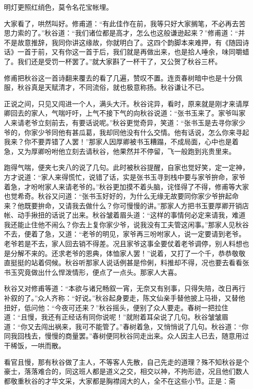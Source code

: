 \documentclass[12pt,UTF8]{ctexbook}
\begin{document}
{{{明灯更照红绡色，莫令名花宝帐埋。

大家看了，哄然叫好。修甫道：“有此佳作在前，我等只好大家搁笔，不必再去苦思力索的了。”秋谷道：“我们诸位都是高才，怎么也这般谦逊起来？”修甫道：“并不是故意推辞，我同你讲这缘故，你就明白了。这四个韵脚本来难押，有《随园诗话》一首于前，又有你这一首于后，我们就是再做出来，也是拾人唾余，味同嚼蜡了。我们还是受罚一杯罢了。”就大家斟了一杯干了，又公贺了秋谷三杯。

修甫把秋谷这一首诗翻来覆去的看了几遍，赞叹不置。连贡春树暗中也是十分佩服，秋谷真是天赋清才，不同流俗，就也极意称扬。秋谷谦让不已。

正说之间，只见又闯进一个人，满头大汗。秋谷诧异，看时，原来就是刚才来请厚卿回去的家人，气喘吁吁，上气不接下气的向秋谷说道：“张书玉来了。家爷叫家人来请老爷立刻前去，有要话说呢。”秋谷更觉奇异，笑道：“张书玉是去寻你家少爷的，你家少爷同他有甚瓜葛，我却同他没有什么交情。他有话说，怎么你来寻起我来？你不要弄错了人罢！”那家人因厚卿被书玉糟蹋，不成局面，心中也是着急，又为厚卿吩咐他立刻去请秋谷，他果然并不停留，飞一般跑到兆贵里来。

跑得气喘，便夹七夹八的说了几句。此时被秋谷提醒，自家也觉好笑，定一定神，方才说道：“家人来得慌忙，说错了话，实是张书玉寻到栈中要与家爷拚命，家爷着急，才吩咐家人来请老爷的。”秋谷更加摸不着头脑，诧怪得了不得，修甫等大家也觉希奇。秋谷又问道：“张书玉好好的，为什么无缘无故要同你家少爷拚起命来？他既要拚命，又请我去做什么？你可慢慢的讲。”那家人方把书玉要厚卿开销店帐、动手揪扭的话说了出来。秋谷皱着眉头道：“这样的事情何必定来请我，难道我还能止住他不闹么？你去上复你家少爷，说我没有工夫管这闲事。”那家人见秋谷不去，便着了急，又道：“老爷的明见，家爷再三吩咐家人，说一定要请到老爷。老爷若是不去，家人回去销不得差。况且家爷这事全要仗着老爷调停，别人料想也是分解不来的。还求老爷的恩典，体恤家人罢！”说着，又打了一个千，恭恭敬敬直挺挺的站着伺候。秋谷听那家人说话例甚是伶俐，料推却不得，况也要去看看张书玉究竟做出什么悍泼情形，便点了一点头。那家人大喜。

秋谷又对修甫等道：“本欲与诸兄畅叙一宵，无奈又有别事，只得失陪，改日再行补叙的了。”众人齐称：“好说。”秋谷起身要走，陈文仙亲手替他披上马褂，又替他扭好，低问他：“今夜可还来？”秋谷摇头，便别了众人要走。春树一把拉住道：“且慢，我还有正经话有同你说呢！”就附着耳朵说了几句。秋谷皱皱眉道：“你又去闯出祸来，我可不能管了。”春树着急，又悄悄说了几句。秋谷道：“你同我回栈去，慢慢的商量罢。”春树便同秋谷同走出来。众人因主人已去，随意用过干稀饭，一哄而散。

看官且慢，那有秋谷做了主人，不等客人先散，自己先走的道理？殊不知秋谷是个豪士，落落难合的，同这班人都是道义之交，相交以神，不拘形迹，况且他们数人都敬重秋谷的才华文采，大家都是胸襟阔大的人，全不在这些小节。正是：斋

}}}
\end{document}
